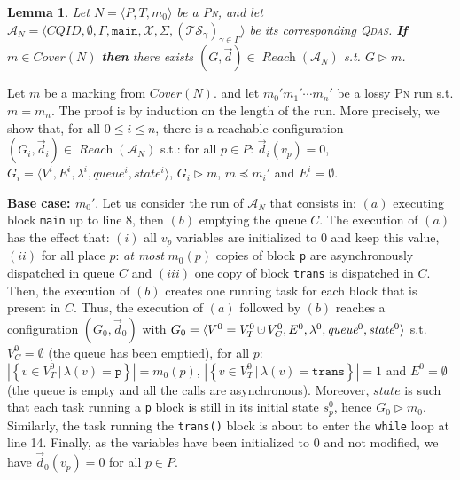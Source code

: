 \documentclass[runningheads,oribibl,]{article}
\newcommand{\mleq}{\preceq}
\newcommand{\tuple}[1]{\langle#1\rangle\xspace}
\newcommand{\set}[2]{\left\{#1\,\vert\,#2\right\}}
\newcommand{\Aa}{\ensuremath{\mathcal{A}}\xspace}
\newcommand{\Ts}{\ensuremath{\mathcal{TS}}\xspace}
\newcommand{\Xx}{\ensuremath{\mathcal{X}}\xspace}
\DeclareMathOperator{\dotcup}{\mathaccent\cdot\cup}
\newcommand{\CQID}{CQID\xspace}
\newcommand{\pn}{\textsc{Pn}\xspace}
\newcommand{\qdas}{\textsc{Qdas}\xspace}
\DeclareMathOperator{\Reach}{\textit{Reach}}
\newcommand{\Cover}{\ensuremath{\textit{Cover}}}
\newcommand{\Data}{\ensuremath{\vec{d}}}
\newcommand{\queue}{\ensuremath{\textit{queue}}}
\newcommand{\state}{\ensuremath{\textit{state}}}
\newtheorem{lemma}{Lemma}{}
\newenvironment{proof}{\noindent{\it Proof.\hspace*{.5cm}}}{}
\begin{document}
\begin{lemma}
  Let $N=\tuple{P,T,m_0}$ be a \pn, and let $\Aa_N=\tuple{\CQID,
    \emptyset, \Gamma, \mathtt{main}, \Xx, \Sigma,
    (\Ts_\gamma)_{\gamma\in\Gamma}}$ be its corresponding \qdas.
  \textbf{If} $m\in\Cover(N)$ \textbf{then} there exists
  $(G,\Data)\in\Reach(\Aa_N)$ s.t. $G\rhd m$.
\end{lemma}
\begin{proof}
  Let $m$ be a marking from $\Cover(N)$.  and let $m_0'm_1'\cdots m_n'$
  be a lossy \pn run s.t. $m=m_n$. The proof is by induction on
  the length of the run. More precisely, we show that, for all $0\leq
  i\leq n$, there is a reachable configuration
  $(G_i,\Data_i)\in\Reach(\Aa_N)$ s.t.: for all $p\in P$:
  $\Data_i(v_p)=0$, $G_i=\tuple{V^i, E^i,
    \lambda^i,\queue^i,\state^i}$, $G_i\rhd m$, $m\mleq m_i'$ and
  $E^i=\emptyset$.

  \textbf{Base case: $m_0'$}. Let us consider the run of $\Aa_N$ that
  consists in: $(a)$ executing block \texttt{main} up to line 8, then
  $(b)$ emptying the queue $C$. The execution of $(a)$ has the effect
  that: $(i)$ all $v_p$ variables are initialized to $0$ and keep this
  value, $(ii)$ for all place $p$: \emph{at most} $m_0(p)$ copies of
  block \texttt{p} are asynchronously dispatched in queue $C$ and
  $(iii)$ one copy of block \texttt{trans} is dispatched in $C$. Then,
  the execution of $(b)$ creates one running task for each block that
  is present in $C$. Thus, the execution of $(a)$ followed by $(b)$
  reaches a configuration $(G_0,\Data_0)$ with
  $G_0=\tuple{V^0=V_T^0\dotcup V_C^0,E^0,\lambda^0, \queue^0,
    \state^0}$ s.t. $V_C^0=\emptyset$ (the queue has been emptied),
  for all $p$: $|\set{v\in V_T^0}{\lambda(v)=\mathtt{p}}|=m_0(p)$,
  $|\set{v\in V_T^0}{\lambda(v)=\mathtt{trans}}|=1$ and
  $E^0=\emptyset$ (the queue is empty and all the calls are
  asynchronous). Moreover, $\state$ is such that each task running a
  \texttt{p} block is still in its initial state $s^0_p$, hence
  $G_0\rhd m_0$. Similarly, the task running the \texttt{trans()}
  block is about to enter the \texttt{while} loop at line 14. Finally,
  as the variables have been initialized to $0$ and not modified, we
  have $\Data_0(v_p)=0$ for all $p\in P$.


\end{proof}
\end{document}
